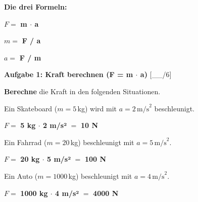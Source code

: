 \documentclass[11pt, a4paper]{article}
\newcommand{\lsg}[1]{\textcolor{loesung}{\textbf{#1}}}
\newcommand{\punktebox}[1]{\hfill\small\textcolor{mittelgrau}{[\_\_/#1]}}
\newcommand{\aufgabe}[1]{%
    \needspace{4\baselineskip}%
    \vspace{10pt}%
    \noindent\textbf{\textcolor{fachfarbe}{Aufgabe #1}}%
    \vspace{4pt}%
    \nopagebreak[4]%
}
\newcommand{\operator}[1]{\textbf{\textcolor{fachfarbe}{#1}}}
\begin{document}
\begin{merkkasten}[title={\textbf{Kasten 4: Das Formel-Dreieck}}]
\begin{minipage}{0.45\linewidth}
\begin{center}
\end{center}
\end{minipage}%
\hfill
\begin{minipage}{0.5\linewidth}
\textbf{Die drei Formeln:}

\vspace{0.3em}
$F = $ \lsg{m $\cdot$ a}

\vspace{0.3em}
$m = $ \lsg{F / a}

\vspace{0.3em}
$a = $ \lsg{F / m}
\end{minipage}
\end{merkkasten}


\aufgabe{1: Kraft berechnen (F = m $\cdot$ a)} \punktebox{6}

\operator{Berechne} die Kraft in den folgenden Situationen.

\begin{teil}
    \item Ein Skateboard ($m = 5\,$kg) wird mit $a = 2\,\text{m/s}^2$ beschleunigt.

    \vspace{0.3em}
    $F = $ \lsg{5 kg $\cdot$ 2 m/s²} $= $ \lsg{10 N}

    \item Ein Fahrrad ($m = 20\,$kg) beschleunigt mit $a = 5\,\text{m/s}^2$.

    \vspace{0.3em}
    $F = $ \lsg{20 kg $\cdot$ 5 m/s²} $= $ \lsg{100 N}

    \item Ein Auto ($m = 1000\,$kg) beschleunigt mit $a = 4\,\text{m/s}^2$.

    \vspace{0.3em}
    $F = $ \lsg{1000 kg $\cdot$ 4 m/s²} $= $ \lsg{4000 N}
\end{teil}
\end{document}
